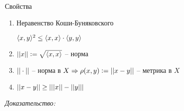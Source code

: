 \documentclass[12pt]{article}
\begin{document}
\begin{theo}{Свойства}
    \begin{enumerate}
        \item Неравенство Коши-Буняковского
        
        $\langle x, y \rangle^2 \leq \langle x, x \rangle \cdot \langle y, y \rangle$

        \item $|| x || := \sqrt{\langle x, x \rangle}$ -- норма
        \item $|| \cdot ||$ -- норма в $X \Rightarrow \rho(x, y) := || x - y ||$ -- метрика в $X$
        \item $|| x - y || \geq ||| x || - || y |||$
    \end{enumerate}
\end{theo}

\newpage

\textit{Доказательство:}
\end{document}
